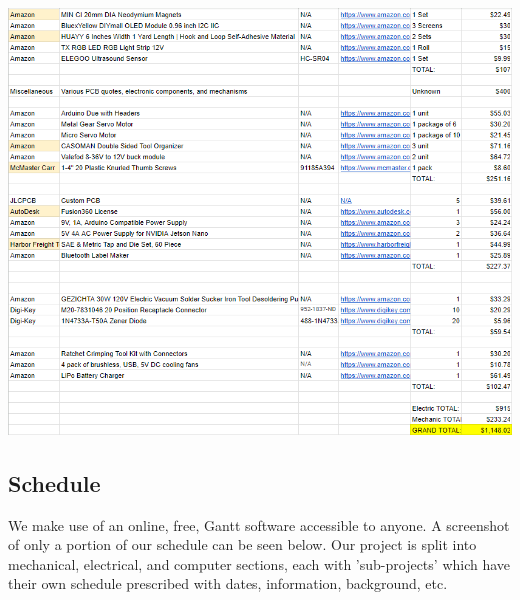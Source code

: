 \documentclass[a4paper, 10pt]{article}
\begin{document}
\includegraphics[scale=0.9]{Bills of Material}

	\subsection{Schedule}
	We make use of an online, free, Gantt software accessible to anyone. A screenshot of only a portion of our schedule can be seen below. Our project is split into mechanical, electrical, and computer sections, each with 'sub-projects' which have their own schedule prescribed with dates, information, background, etc.
\end{document}
